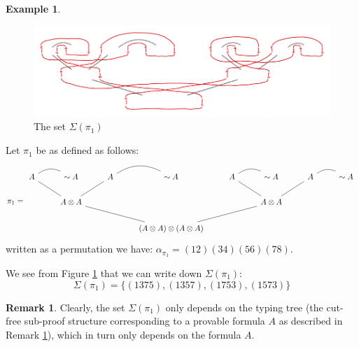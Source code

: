 \documentclass[12pt]{article}
\theoremstyle{plain}
\theoremstyle{definition}
\newtheorem{remark}[thm]{Remark}
\newtheorem{example}[thm]{Example}
\newcommand{\negation}{\sim}
\begin{document}
	\begin{example}\label{ex:counter}
		\begin{figure}[h]
			\centering
			\includegraphics[width = 17cm]{Permutations.png}
			\caption{The set $\Sigma(\pi_1)$}
			\label{fig:counter_one}
		\end{figure}
		Let $\pi_1$ be as defined as follows:
		\begin{equation}
			\pi_1 = \begin{tikzcd}
				A \arrow[r, dash,bend left] \arrow[rd,dash] & \negation A             & A \arrow[r, dash,bend left] \arrow[ld,dash] & \negation A                         & A \arrow[r, dash,bend left] \arrow[rd,dash] & \negation A             & A \arrow[r, dash,bend left] \arrow[ld,dash] & \negation A \\
				& A \otimes A \arrow[rrd,dash] &                                   &                                     &                                   & A \otimes A \arrow[lld,dash] &                                   &             \\
				&                         &                                   & (A \otimes A) \otimes (A \otimes A) &                                   &                         &                                   &            
			\end{tikzcd}
		\end{equation}
		written as a permutation we have: $\alpha_{\pi_1} = (12)(34)(56)(78)$.
		
		We see from Figure \ref{ex:counter} that we can write down $\Sigma(\pi_1)$:
		\begin{equation}
			\Sigma(\pi_1) = \lbrace (1375), (1357), (1753), (1573)\rbrace
		\end{equation}
		\begin{remark}\label{rmk:trunk}
			Clearly, the set $\Sigma(\pi_1)$ only depends on the typing tree (the cut-free sub-proof structure corresponding to a provable formula $A$ as described in Remark \ref{rmk:trunk}), which in turn only depends on the formula $A$.
		\end{remark}
	\end{example}
\end{document}
